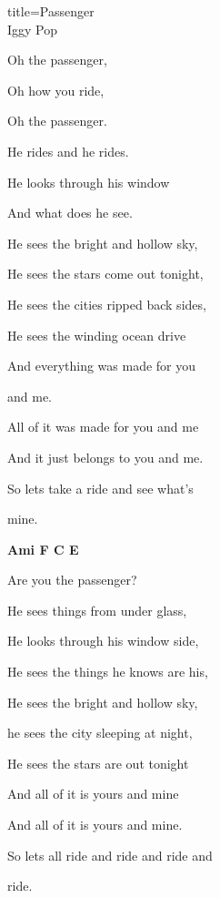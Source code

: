 \begin{song}{title=\predtitle \centering Passenger \\\large Iggy Pop }
{\begin{centerjustified}
\begin{varwidth}[t]{0.5\textwidth}
\end{varwidth}\mezisloupci\begin{varwidth}[t]{0.6\textwidth}\setlength{\parindent}{\pindent}
\sloka
Oh the passenger,

Oh how you ride,

Oh the passenger.

He rides and he rides.

He looks through his window

And what does he see.

He sees the bright and hollow sky,

He sees the stars come out tonight,

He sees the cities ripped back sides,

He sees the winding ocean drive

And everything was made for you

and me.

All of it was made for you and me

And it just belongs to you and me.

So lets take a ride and see what's

mine.




\textbf{Ami F C E}

\sloka
Are you the passenger?

He sees things from under glass,

He looks through his window side,

He sees the things he knows are his,

He sees the bright and hollow sky,

he sees the city sleeping at night,

He sees the stars are out tonight

And all of it is yours and mine

And all of it is yours and mine.

So lets all ride and ride and ride and

ride.

\end{varwidth}

\end{centerjustified}
}
\setcounter{Slokočet}{0}
\end{song}
